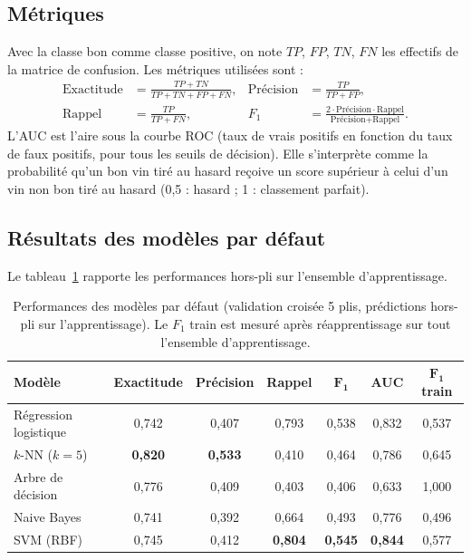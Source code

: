 \documentclass[11pt,a4paper]{article}
\newcommand{\Fun}{F_1}
\begin{document}
\subsection{Métriques}
Avec la classe \og bon \fg{} comme classe positive, on note $TP$, $FP$, $TN$, $FN$ les effectifs de la matrice de confusion. Les métriques utilisées sont :
\begin{align}
\text{Exactitude} &= \frac{TP+TN}{TP+TN+FP+FN}, &
\text{Précision} &= \frac{TP}{TP+FP}, \\
\text{Rappel} &= \frac{TP}{TP+FN}, &
\Fun &= \frac{2\cdot\text{Précision}\cdot\text{Rappel}}{\text{Précision}+\text{Rappel}}.
\end{align}
L'AUC est l'aire sous la courbe ROC (taux de vrais positifs en fonction du taux de faux positifs, pour tous les seuils de décision). Elle s'interprète comme la probabilité qu'un bon vin tiré au hasard reçoive un score supérieur à celui d'un vin non bon tiré au hasard (0,5 : hasard ; 1 : classement parfait).

\subsection{Résultats des modèles par défaut}
Le tableau~\ref{tab:defaut} rapporte les performances hors-pli sur l'ensemble d'apprentissage.

\begin{table}[H]
\centering
\caption{Performances des modèles par défaut (validation croisée 5 plis, prédictions hors-pli sur l'apprentissage). Le $\Fun$ train est mesuré après réapprentissage sur tout l'ensemble d'apprentissage.}
\label{tab:defaut}
\small
\begin{tabular}{lcccccc}
\toprule
\textbf{Modèle} & \textbf{Exactitude} & \textbf{Précision} & \textbf{Rappel} & $\boldsymbol{\Fun}$ & \textbf{AUC} & $\boldsymbol{\Fun}$ \textbf{train} \\
\midrule
Régression logistique & 0,742 & 0,407 & 0,793 & 0,538 & 0,832 & 0,537 \\
$k$-NN ($k=5$)        & \textbf{0,820} & \textbf{0,533} & 0,410 & 0,464 & 0,786 & 0,645 \\
Arbre de décision     & 0,776 & 0,409 & 0,403 & 0,406 & 0,633 & 1,000 \\
Naive Bayes           & 0,741 & 0,392 & 0,664 & 0,493 & 0,776 & 0,496 \\
SVM (RBF)             & 0,745 & 0,412 & \textbf{0,804} & \textbf{0,545} & \textbf{0,844} & 0,577 \\
\bottomrule
\end{tabular}
\end{table}
\end{document}
